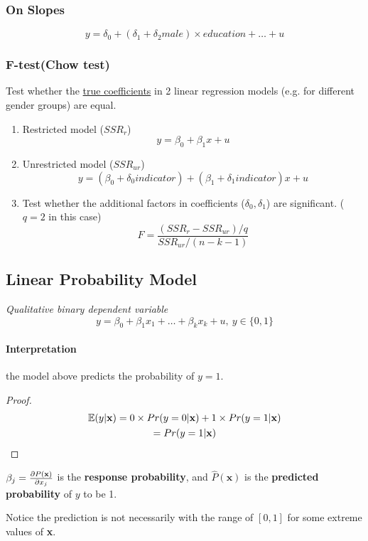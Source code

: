 \documentclass[]{article}
\begin{document}
			\subsubsection{On Slopes}
			\[
				y = \delta_0 + (\delta_1 + \delta_2 male)\times education + \dots + u
			\]
			
			\subsubsection{F-test(Chow test)}
			\par Test whether the \ul{true coefficients} in 2 linear regression models (e.g. for different gender groups) are equal. 
			\begin{enumerate}
				\item Restricted model ($SSR_r$) \[y = \beta_0 + \beta_1 x + u \]
				\item Unrestricted model ($SSR_{ur}$) \[y = (\beta_0 + \delta_0 indicator) + (\beta_1 + \delta_1 indicator) x + u\]
				\item Test whether the additional factors in coefficients ($\delta_0, \delta_1$) are significant. ($q=2$ in this case)
				\[
					F = \frac{(SSR_{r} - SSR_{ur})/q}{SSR_{ur}/(n-k-1)}
				\]
			\end{enumerate}
		\subsection{Linear Probability Model}
			\emph{Qualitative binary dependent variable}
			\[
				y = \beta_0 + \beta_1 x_1 + \dots + \beta_k x_k + u,\ y \in \{0, 1\}
			\]
			\paragraph{Interpretation} the model above predicts the probability of $y=1$.
				\begin{proof}
					\begin{gather*}
						\mathbb{E}({y|\textbf{x}}) = 0 \times Pr(y=0|\textbf{x}) + 1 \times Pr(y=1|\textbf{x}) \\
						= Pr(y=1|\textbf{x})
					\end{gather*}
				\end{proof}
			\begin{remark}
				$\beta_j = \frac{\partial{P(\textbf{x})}}{\partial{x_j}}$ is the \textbf{response probability}, and $\hat{P}(\textbf{x})$ is the \textbf{predicted probability} of $y$ to be 1.
			\end{remark}
			\begin{remark}
				Notice the prediction is not necessarily with the range of $[0,1]$ for some extreme values of \textbf{x}.
			\end{remark}
\end{document}
